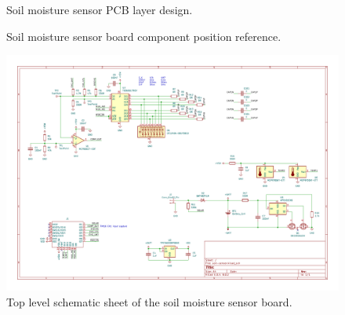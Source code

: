
\begin{figure}[H]
    \hfill
    \caption{\label{board:sensor}Soil moisture sensor PCB layer design.}
\end{figure}

\begin{figure}[H]
    \hfil
    \caption{\label{board:sensor-components}Soil moisture sensor board component position reference.}
\end{figure}

\begin{figure}
    \includegraphics[page=1,angle=-90,width=\textwidth]{boards/sensor/soil-sensor.pdf}
    \caption{\label{schematic:sensor-1}Top level schematic sheet of the soil moisture sensor board.}
\end{figure}